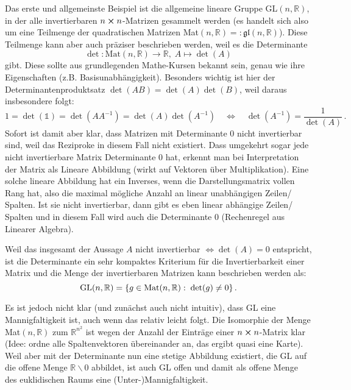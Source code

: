 \documentclass[../H_Analysis_main.tex]{subfiles}
\begin{document}
\begin{bsp}[GL$(n, \mathbb{R})$]
Das erste und allgemeinste Beispiel ist die allgemeine lineare Gruppe GL$(n, \mathbb{R})$, in der alle invertierbaren $n \cross n$-Matrizen gesammelt werden (es handelt sich also um eine Teilmenge der quadratischen Matrizen Mat$(n, \mathbb{R}) =: \mathfrak{gl}(n, \mathbb{R})$). Diese Teilmenge kann aber auch präziser beschrieben werden, weil es die Determinante
\begin{equation}
\det: \text{Mat}(n, \mathbb{R}) \rightarrow \mathbb{R}, \; A \mapsto \det(A)
\end{equation}
gibt. Diese sollte aus grundlegenden Mathe-Kursen bekannt sein, genau wie ihre Eigenschaften (z.B. Basisunabhängigkeit). Besonders wichtig ist hier der Determinantenproduktsatz $\det(AB) = \det(A) \det(B)$, weil daraus insbesondere folgt:
\begin{equation*}
1 = \det(\mathds{1}) = \det(A A^{-1}) = \det(A) \det(A^{-1}) \quad \Leftrightarrow \quad \det(A^{-1}) = \frac{1}{\det(A)} \, .
\end{equation*}
Sofort ist damit aber klar, dass Matrizen mit Determinante 0 nicht invertierbar sind, weil das Reziproke in diesem Fall nicht existiert. Dass umgekehrt sogar jede nicht invertierbare Matrix Determinante 0 hat, erkennt man bei Interpretation der Matrix als Lineare Abbildung (wirkt auf Vektoren über Multiplikation). Eine solche lineare Abbildung hat ein Inverses, wenn die Darstellungsmatrix vollen Rang hat, also die maximal mögliche Anzahl an linear unabhängigen Zeilen/ Spalten. Ist sie nicht invertierbar, dann gibt es eben linear abhängige Zeilen/ Spalten und in diesem Fall wird auch die Determinante 0 (Rechenregel aus Linearer Algebra).

Weil das insgesamt der Aussage $A$ nicht invertierbar $\Leftrightarrow \det(A) = 0$ entspricht, ist die Determinante ein sehr kompaktes Kriterium für die Invertierbarkeit einer Matrix und die Menge der invertierbaren Matrizen kann beschrieben werden als:
\begin{equation}
\text{GL}(n, \mathbb{R}) = \qty{g \in \text{Mat}(n, \mathbb{R}): \; \det(g) \neq 0} \, .
\end{equation}



Es ist jedoch nicht klar (und zunächst auch nicht intuitiv), dass GL eine Mannigfaltigkeit ist, auch wenn das relativ leicht folgt. Die Isomorphie der Menge Mat$(n, \mathbb{R})$ zum $\mathbb{R}^{n^2}$ ist wegen der Anzahl der Einträge einer $n \cross n$-Matrix klar (Idee: ordne alle Spaltenvektoren übereinander an, das ergibt quasi eine Karte). Weil aber mit der Determinante nun eine stetige Abbildung existiert, die GL auf die offene Menge $\mathbb{R} \backslash \qty{0}$ abbildet, ist auch GL offen und damit als offene Menge des euklidischen Raums eine (Unter-)Mannigfaltigkeit.



\end{bsp}
\end{document}
